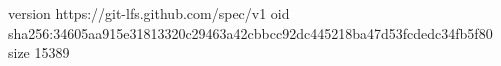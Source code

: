 version https://git-lfs.github.com/spec/v1
oid sha256:34605aa915e31813320c29463a42cbbcc92dc445218ba47d53fcdedc34fb5f80
size 15389
